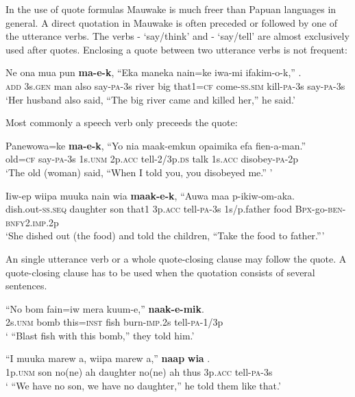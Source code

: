 In the use of quote formulas Mauwake is much freer than Papuan languages in general. A direct quotation in Mauwake is often preceded or followed by one of the utterance verbs. The verbs - `say/think' and - `say/tell' are almost exclusively used after quotes. Enclosing a quote between two utterance verbs is not frequent:

\ea%
\label{ex:8:x1571}
\gll Ne  ona  mua  pun  \textbf{ma-e-k},  ``Eka  maneka  nain=ke iwa-mi  ifakim-o-k,''  .\\
\textsc{add} 3s.\textsc{gen} man  also  say-\textsc{pa}-3s river big  that1=\textsc{cf} come-\textsc{ss}.\textsc{sim} kill-\textsc{pa}-3s  say-\textsc{pa}-3s\\
\glt`Her husband also said, ``The big river came and killed her,'' he said.'
\z


Most commonly a speech verb only preceeds the quote:

\ea%
\label{ex:8:x1578}
\gll Panewowa=ke  \textbf{ma-e-k},  ``Yo  nia  maak-emkun  opaimika efa  fien-a-man.''\\
old=\textsc{cf} say-\textsc{pa}-3s 1s.\textsc{unm} 2p.\textsc{acc} tell-2/3p.\textsc{ds} talk 1s.\textsc{acc} disobey-\textsc{pa}-2p\\
\glt`The old (woman) said, ``When I told you, you disobeyed me.'' '
\z


\ea%
\label{ex:8:x1579}
\gll Iiw-ep  wiipa  muuka  nain  wia  \textbf{maak-e-k}, ``Auwa  maa  p-ikiw-om-aka.\\
dish.out-\textsc{ss}.\textsc{seq} daughter  son  that1 3p.\textsc{acc} tell-\textsc{pa}-3s 1s/p.father food \textsc{Bpx}-go-\textsc{ben}-\textsc{bnfy}2.\textsc{imp}.2p\\
\glt`She dished out (the food) and told the children, ``Take the food to father.''{}'
\z


An single utterance verb or a whole quote-closing clause may follow the quote. A quote-closing clause has to be used when the quotation consists of several sentences.

\ea%
\label{ex:8:x1580}
\gll ``No  bom  fain=iw  mera  kuum-e,''  \textbf{naak-e-mik}. \\
2s.\textsc{unm} bomb this=\textsc{inst} fish burn-\textsc{imp}.2s  tell-\textsc{pa}-1/3p\\
\glt` ``Blast fish with this bomb,'' they told him.'
\z


\ea%
\label{ex:8:x1583}
\gll ``I  muuka  marew  a,  wiipa  marew  a,''  \textbf{naap} \textbf{wia} .\\
1p.\textsc{unm} son  no(ne)  ah  daughter  no(ne)  ah  thus 3p.\textsc{acc} tell-\textsc{pa}-3s\\
\glt` ``We have no son, we have no daughter,'' he told them like that.'
\z


